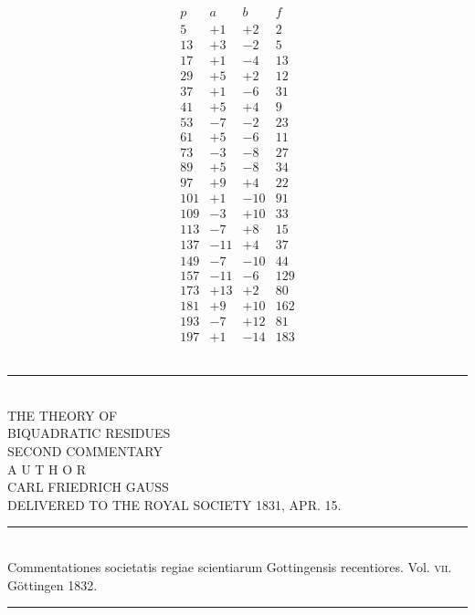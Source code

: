 \documentclass[twoside,12pt]{memoir}
\begin{document}
\[\begin{array}{r|r|r|r}
p & a & b & f \\
\hline
5 & +1 & +2 & 2 \\
13 & +3 & -2 & 5 \\
17 & +1& -4 & 13 \\
29 & +5 & +2 & 12 \\
37 & +1 & -6 & 31 \\
41 & +5 & +4 & 9 \\
53 & -7 & -2 & 23 \\
61 & +5 & -6 & 11 \\
73 & -3 & -8 & 27 \\
89 & +5 & -8 & 34 \\
97 & +9 & +4 & 22 \\
101 & +1 & -10 & 91 \\
109 & -3 & +10 & 33 \\
113 & -7 & +8 & 15 \\
137 & -11 & +4 & 37 \\
149 & -7 & -10 & 44 \\
157 & -11 & -6 & 129 \\
173 & +13 & +2 & 80 \\
181 & +9 & +10 & 162 \\
193 & -7 & +12 & 81 \\
197 & +1 & -14 & 183 
\end{array}\]\\[\baselineskip]
\begin{center} 
\rule{2in}{0.5pt}
\end{center}
\pagebreak%

\begin{center}
\;\\[4\baselineskip]
{\large THE THEORY OF}\\[\baselineskip]
{\LARGE BIQUADRATIC RESIDUES}\\[3\baselineskip]
{\large SECOND COMMENTARY}\\[2.5\baselineskip]
{\tiny A U T H O R}\\[1.5\baselineskip]
CARL FRIEDRICH GAUSS\\[1.5\baselineskip]
{\scriptsize DELIVERED TO THE ROYAL SOCIETY {\tiny \textsc{1831},} APR. {\tiny \textsc{15}.}}\\[4\baselineskip]
\rule{4in}{0.5pt}\\[0.5\baselineskip]
{\small Commentationes societatis regiae scientiarum Gottingensis recentiores. Vol. \textsc{vii}.\\
Göttingen \textsc{1832}.}\\
\rule{4in}{0.5pt}
\end{center}
\pagebreak%
\;\pagebreak%
\end{document}
